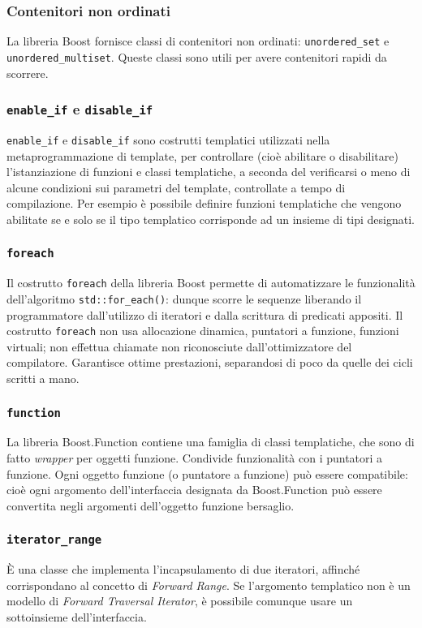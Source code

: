 \subsubsection{Contenitori non ordinati}
La libreria Boost fornisce classi di contenitori non ordinati:
{\tt unordered\_set} e {\tt unordered\_multiset}.
Queste classi sono utili per avere contenitori rapidi da scorrere.

\subsubsection{{\tt enable\_if} e {\tt disable\_if}}
{\tt enable\_if} e {\tt disable\_if} sono costrutti templatici
utilizzati nella metaprogrammazione di template, per controllare (cioè
abilitare o disabilitare) l'istanziazione di funzioni e classi
templatiche, a seconda del verificarsi o meno di alcune condizioni sui
parametri del template, controllate a tempo di compilazione.
Per esempio è possibile definire funzioni templatiche che vengono
abilitate se e solo se il tipo templatico corrisponde ad un insieme di
tipi designati.

\subsubsection{{\tt foreach}}
Il costrutto {\tt foreach} della libreria Boost permette di
automatizzare le funzionalità dell'algoritmo {\tt std::for\_each()}:
dunque scorre le sequenze liberando il programmatore dall'utilizzo di
iteratori e dalla scrittura di predicati appositi.
Il costrutto {\tt foreach} non usa allocazione dinamica, puntatori a
funzione, funzioni virtuali; non effettua chiamate non riconosciute
dall'ottimizzatore del compilatore.
Garantisce ottime prestazioni, separandosi di poco da quelle dei cicli
scritti a mano.

\subsubsection{{\tt function}}
La libreria Boost.Function contiene una famiglia di classi templatiche,
che sono di fatto \textit{wrapper} per oggetti funzione.
Condivide funzionalità con i puntatori a funzione.
Ogni oggetto funzione (o puntatore a funzione) può essere compatibile:
cioè ogni argomento dell'interfaccia designata da \linebreak
Boost.Function può essere convertita negli argomenti dell'oggetto
funzione bersaglio.

\subsubsection{{\tt iterator\_range}}
È una classe che implementa l'incapsulamento di due iteratori, affinché
corrispondano al concetto di \textit{Forward Range}.
Se l'argomento templatico non è un modello di \textit{Forward Traversal
Iterator}, è possibile comunque usare un sottoinsieme dell'interfaccia.

